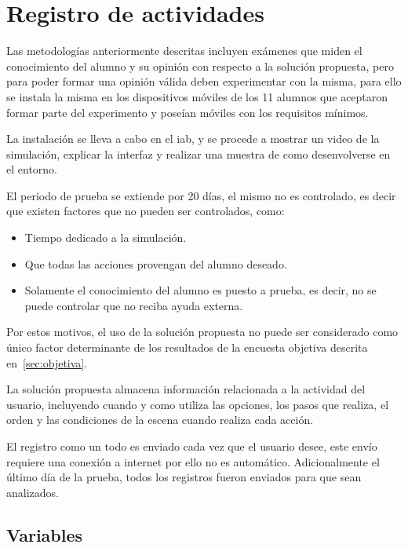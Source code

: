 \section{Registro de actividades}
\label{sec:registro}

Las metodologías anteriormente descritas incluyen exámenes que miden
el conocimiento del alumno y su opinión con respecto a la solución propuesta,
pero para poder formar una opinión válida deben experimentar con la misma, para
ello se instala la misma en los dispositivos móviles de los 11 alumnos que
aceptaron formar parte del experimento y poseían móviles con los requisitos
mínimos.

La instalación se lleva a cabo en el \Gls{iab}, y se procede a mostrar un video
de la simulación, explicar la interfaz y realizar una muestra de como
desenvolverse en el entorno.

El periodo de prueba se extiende por 20 días, el mismo no es controlado, es
decir que existen factores que no pueden ser controlados, como:

\begin{itemize}
    \item Tiempo dedicado a la simulación.
    \item Que todas las acciones provengan del alumno deseado.
    \item Solamente el conocimiento del alumno es puesto a prueba, es decir, no
        se puede controlar que no reciba ayuda externa.
\end{itemize}


Por estos motivos, el uso de la solución propuesta no puede ser considerado
como único factor determinante de los resultados de la encuesta objetiva
descrita en~\ref{sec:objetiva}.

La solución propuesta almacena información relacionada a la actividad del
usuario, incluyendo cuando y como utiliza las opciones, los pasos que realiza,
el orden y las condiciones de la escena cuando realiza cada acción.

El registro como un todo es enviado cada vez que el usuario desee, este envío
requiere una conexión a internet por ello no es automático. Adicionalmente el
último día de la prueba, todos los registros fueron enviados para que sean
analizados.


\subsection{Variables}

